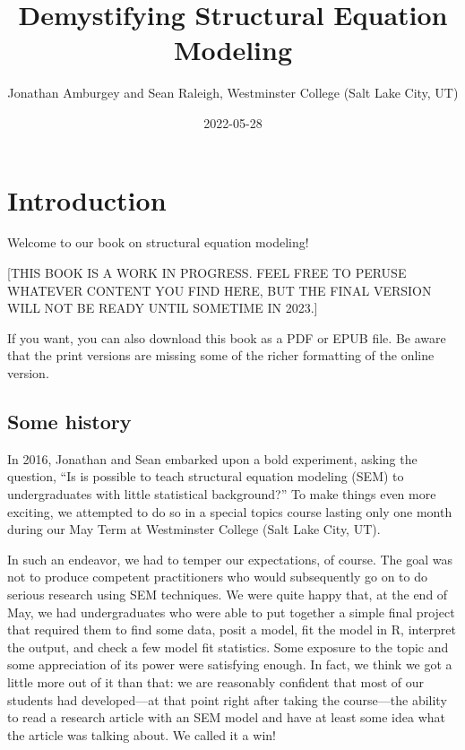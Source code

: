 \documentclass[
]{book}
\title{Demystifying Structural Equation Modeling}
\author{Jonathan Amburgey and Sean Raleigh, Westminster College (Salt Lake City, UT)}
\date{2022-05-28}
\begin{document}
\maketitle

{
\setcounter{tocdepth}{1}
\tableofcontents
}
\hypertarget{intro}{%
\chapter*{Introduction}\label{intro}}

Welcome to our book on structural equation modeling!

{[}THIS BOOK IS A WORK IN PROGRESS. FEEL FREE TO PERUSE WHATEVER CONTENT YOU FIND HERE, BUT THE FINAL VERSION WILL NOT BE READY UNTIL SOMETIME IN 2023.{]}

If you want, you can also download this book as a PDF or EPUB file. Be aware that the print versions are missing some of the richer formatting of the online version.

\hypertarget{intro-history}{%
\section*{Some history}\label{intro-history}}

In 2016, Jonathan and Sean embarked upon a bold experiment, asking the question, ``Is is possible to teach structural equation modeling (SEM) to undergraduates with little statistical background?'' To make things even more exciting, we attempted to do so in a special topics course lasting only one month during our May Term at Westminster College (Salt Lake City, UT).

In such an endeavor, we had to temper our expectations, of course. The goal was not to produce competent practitioners who would subsequently go on to do serious research using SEM techniques. We were quite happy that, at the end of May, we had undergraduates who were able to put together a simple final project that required them to find some data, posit a model, fit the model in R, interpret the output, and check a few model fit statistics. Some exposure to the topic and some appreciation of its power were satisfying enough. In fact, we think we got a little more out of it than that: we are reasonably confident that most of our students had developed---at that point right after taking the course---the ability to read a research article with an SEM model and have at least some idea what the article was talking about. We called it a win!
\end{document}
